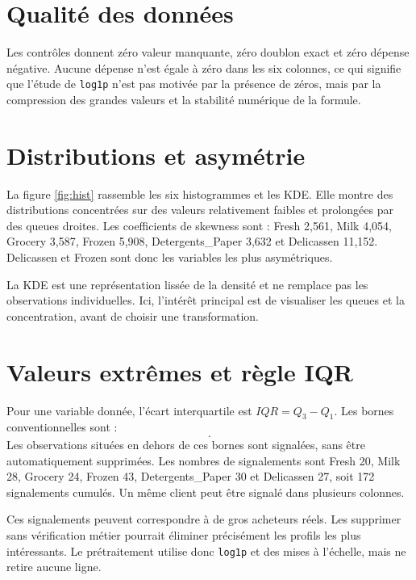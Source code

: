 \section{Qualité des données}
Les contrôles donnent zéro valeur manquante, zéro doublon exact et zéro dépense négative. Aucune dépense n'est égale à zéro dans les six colonnes, ce qui signifie que l'étude de \texttt{log1p} n'est pas motivée par la présence de zéros, mais par la compression des grandes valeurs et la stabilité numérique de la formule.

\section{Distributions et asymétrie}
La figure \ref{fig:hist} rassemble les six histogrammes et les KDE. Elle montre des distributions concentrées sur des valeurs relativement faibles et prolongées par des queues droites. Les coefficients de skewness sont : Fresh 2,561, Milk 4,054, Grocery 3,587, Frozen 5,908, Detergents\_Paper 3,632 et Delicassen 11,152. Delicassen et Frozen sont donc les variables les plus asymétriques.


La KDE est une représentation lissée de la densité et ne remplace pas les observations individuelles. Ici, l'intérêt principal est de visualiser les queues et la concentration, avant de choisir une transformation.

\section{Valeurs extrêmes et règle IQR}
Pour une variable donnée, l'écart interquartile est $IQR=Q_3-Q_1$. Les bornes conventionnelles sont :
\begin{equation}
[Q_1-1,5\,IQR,\;Q_3+1,5\,IQR].
\end{equation}
Les observations situées en dehors de ces bornes sont signalées, sans être automatiquement supprimées. Les nombres de signalements sont Fresh 20, Milk 28, Grocery 24, Frozen 43, Detergents\_Paper 30 et Delicassen 27, soit 172 signalements cumulés. Un même client peut être signalé dans plusieurs colonnes.


Ces signalements peuvent correspondre à de gros acheteurs réels. Les supprimer sans vérification métier pourrait éliminer précisément les profils les plus intéressants. Le prétraitement utilise donc \texttt{log1p} et des mises à l'échelle, mais ne retire aucune ligne.

